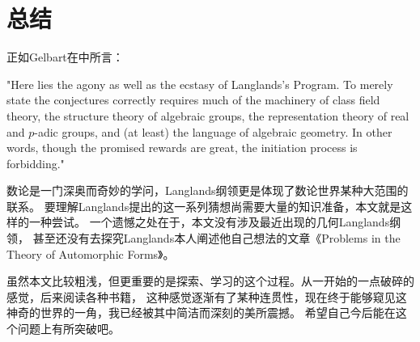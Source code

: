 

\chapter{总结}
\label{cha:china}
  正如Gelbart在中所言：

  "Here lies the agony as well as the ecstasy of Langlands's
  Program. To merely state the conjectures correctly requires much
  of the machinery of class field theory, the structure theory of
  algebraic groups, the representation theory of real and $p$-adic
  groups, and (at least) the language of algebraic geometry. In other words,
  though the promised rewards are great, the initiation process is
  forbidding."

  数论是一门深奥而奇妙的学问，Langlands纲领更是体现了数论世界某种大范围的联系。
  要理解Langlands提出的这一系列猜想尚需要大量的知识准备，本文就是这样的一种尝试。
  一个遗憾之处在于，本文没有涉及最近出现的几何Langlands纲领，
  甚至还没有去探究Langlands本人阐述他自己想法的文章《Problems in the Theory of Automorphic
  Forms》。

  虽然本文比较粗浅，但更重要的是探索、学习的这个过程。从一开始的一点破碎的感觉，后来阅读各种书籍，
  这种感觉逐渐有了某种连贯性，现在终于能够窥见这神奇的世界的一角，我已经被其中简洁而深刻的美所震撼。
  希望自己今后能在这个问题上有所突破吧。
